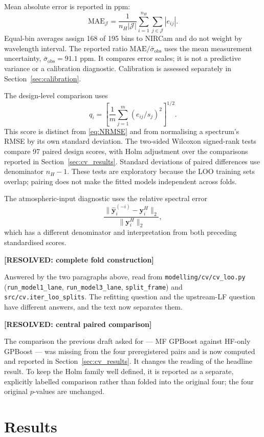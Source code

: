 \documentclass[12pt, letterpaper, oneside]{article}
\newcommand{\resolved}[2]{\par\begingroup\small\color{green!35!black}%
\noindent\textbf{[RESOLVED: #1]}\par\nobreak\noindent #2\par\endgroup}
\begin{document}
Mean absolute error is reported in ppm:
\begin{equation}
\mathrm{MAE}_{\mathcal J}=
\frac1{n_H|\mathcal J|}\sum_{i=1}^{n_H}\sum_{j\in\mathcal J}|e_{ij}|.
\label{eq:MAE}
\end{equation}
Equal-bin averages assign 168 of 195 bins to NIRCam and do not weight by
wavelength interval. The reported ratio
$\mathrm{MAE}/\bar\sigma_{\mathrm{obs}}$ uses the mean measurement
uncertainty, $\bar\sigma_{\mathrm{obs}}=91.1$ ppm. It compares error scales;
it is not a predictive variance or a calibration diagnostic. Calibration is
assessed separately in Section~\ref{sec:calibration}.

The design-level comparison uses
\[
q_i=\left[\frac1m\sum_{j=1}^{m}(e_{ij}/s_j)^2\right]^{1/2}.
\]
This score is distinct from \eqref{eq:NRMSE} and from normalising a
spectrum's RMSE by its own standard deviation. The two-sided Wilcoxon
signed-rank tests compare 97 paired design scores, with Holm adjustment over
the comparisons reported in Section~\ref{sec:cv_results}. Standard deviations
of paired differences use denominator $n_H-1$. These tests are exploratory
because the LOO training sets overlap; pairing does not make the fitted models
independent across folds.

The atmospheric-input diagnostic uses the relative spectral error
\[
\frac{\|\widehat{\mathbf y}^{(-i)}_i-\mathbf y^H_i\|_2}
{\|\mathbf y^H_i\|_2},
\]
which has a different denominator and interpretation from both preceding
standardised scores.

\resolved{complete fold construction}{Answered by the two paragraphs above,
read from \texttt{modelling/cv/cv\_loo.py} (\texttt{run\_model1\_lane},
\texttt{run\_model3\_lane}, \texttt{split\_frame}) and
\texttt{src/cv.iter\_loo\_splits}. The refitting question and the upstream-LF
question have different answers, and the text now separates them.}

\resolved{central paired comparison}{The comparison the previous draft asked
for --- MF GPBoost against HF-only GPBoost --- was missing from the four
preregistered pairs and is now computed and reported in
Section~\ref{sec:cv_results}. It changes the reading of the headline result.
To keep the Holm family well defined, it is reported as a separate,
explicitly labelled comparison rather than folded into the original four;
the four original $p$-values are unchanged.}

\section{Results}
\label{sec:results}
\end{document}
